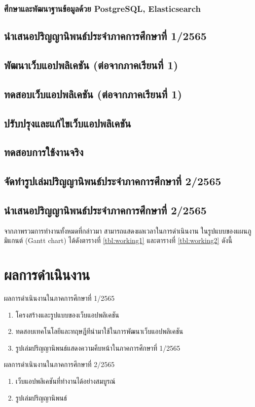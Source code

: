 \documentclass[12pt,oneside,openright,a4paper]{cpe-thai-project}
\begin{document}
    \subsubsection{ศึกษาและพัฒนาฐานข้อมูลด้วย PostgreSQL, Elasticsearch}
  \subsection{นำเสนอปริญญานิพนธ์ประจำภาคการศึกษาที่ 1/2565}
  \subsection{พัฒนาเว็บแอปพลิเคชัน (ต่อจากภาคเรียนที่ 1)}
  \subsection{ทดสอบเว็บแอปพลิเคชัน (ต่อจากภาคเรียนที่ 1)}
  \subsection{ปรับปรุงและแก้ไขเว็บแอปพลิเคชัน}
  \subsection{ทดสอบการใช้งานจริง}
  \subsection{จัดทำรูปเล่มปริญญานิพนธ์ประจำภาคการศึกษาที่ 2/2565}
  \subsection{นำเสนอปริญญานิพนธ์ประจำภาคการศึกษาที่ 2/2565}

\hspace*{1cm}จากภาพรวมการทำงานทั้งหมดที่กล่าวมา สามารถแสดงผลเวลาในการดำเนินงาน ในรูปแบบของแผนภูมิแกนต์ (Gantt chart) ได้ดังตารางที่ \ref{tbl:working1} และตารางที่ \ref{tbl:working2} ดังนี้


\section{ผลการดำเนินงาน}
\hspace*{1cm} ผลการดำเนินงานในภาคการศึกษาที่ 1/2565
\begin{enumerate}
  \item โครงสร้างและรูปแบบของเว็บแอปพลิเคชัน
  \item ทดสอบเทคโนโลยีและทฤษฎีทีนำมาใช้ในการพัฒนาเว็บแอปพลิเคชัน
  \item รูปเล่มปริญญานิพนธ์แสดงความคืบหน้าในภาคการศึกษาที่ 1/2565
\end{enumerate}
\hspace*{1cm} ผลการดำเนินงานในภาคการศึกษาที่ 2/2565
\begin{enumerate}
  \item เว็บแอปพลิเคชันที่ทำงานได้อย่างสมบูรณ์
  \item รูปเล่มปริญญานิพนธ์
\end{enumerate}
\end{document}
